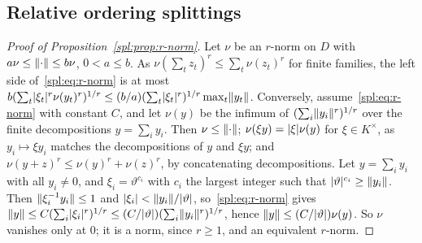 \subsection{Relative ordering splittings}\label{ord:ssec:relative}

\begin{proof}[Proof of Proposition~\ref{spl:prop:r-norm}]
Let $\nu$ be an $r$\nobreakdash-norm on $D$ with $a\nu\le\lVert \cdot\rVert\le b\nu$, $0<a\le b$. As
$\nu(\sum_tz_t)^r\le\sum_t\nu(z_t)^r$ for finite families, the left side of~\eqref{spl:eq:r-norm} is at most
$b(\sum_t\lvert \xi_t\rvert^r\nu(y_t)^r)^{1/r}\le(b/a)(\sum_t\lvert \xi_t\rvert^r)^{1/r}\max_t\lVert y_t\rVert$. Conversely,
assume~\eqref{spl:eq:r-norm} with constant $C$, and let $\nu(y)$ be the infimum of $(\sum_i\lVert y_i\rVert^r)^{1/r}$ over
the finite decompositions $y=\sum_iy_i$. Then $\nu\le\lVert \cdot\rVert$;
$\nu(\xi y)=\lvert \xi\rvert\nu(y)$ for $\xi\in K^\times$, as $y_i\mapsto\xi y_i$ matches the decompositions of $y$ and $\xi y$;
and $\nu(y+z)^r\le\nu(y)^r+\nu(z)^r$, by concatenating decompositions. Let $y=\sum_iy_i$ with all $y_i\ne0$, and
$\xi_i=\vartheta^{c_i}$ with $c_i$ the largest integer such that $\lvert \vartheta\rvert^{c_i}\ge\lVert y_i\rVert$. Then
$\lVert \xi_i^{-1}y_i\rVert\le1$ and $\lvert \xi_i\rvert<\lVert y_i\rVert/\lvert \vartheta\rvert$, so~\eqref{spl:eq:r-norm} gives
$\lVert y\rVert\le C(\sum_i\lvert \xi_i\rvert^r)^{1/r}\le(C/\lvert \vartheta\rvert)(\sum_i\lVert y_i\rVert^r)^{1/r}$, hence
$\lVert y\rVert\le(C/\lvert \vartheta\rvert)\nu(y)$. So $\nu$ vanishes only at $0$; it is a norm, since $r\ge1$, and an equivalent
$r$\nobreakdash-norm.
\end{proof}


